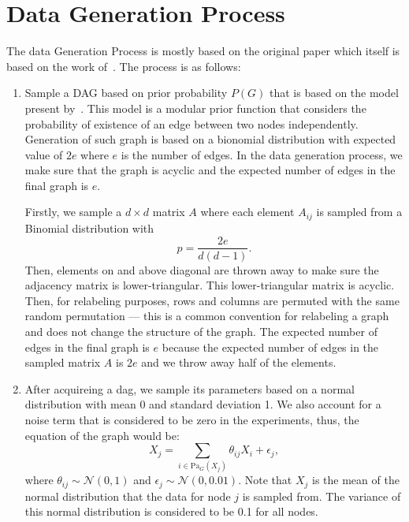 \documentclass{lxaiproposal}
\begin{document}
\begin{table}[h]
        \section{Data Generation Process}\label{app:data_generation}
        \vspace*{-3mm}

        The data Generation Process is mostly based on the original paper which itself is based on the work of~\cite{erdos1960evolutionrandomgraphs}.
        The process is as follows:

        \begin{enumerate}
            \item Sample a DAG based on prior probability $P(G)$ that is based on the model present by~\cite{erdos1960evolutionrandomgraphs}.
            This model is a modular prior function that considers the probability of existence of an edge between two
            nodes independently. Generation of such graph is based on a bionomial distribution with expected value of $2e$
            where $e$ is the number of edges. In the data generation process, we make sure that the graph is acyclic and
            the expected number of edges in the final graph is $e$.

            Firstly, we sample a $d \times d$ matrix $A$ where each element $A_{ij}$ is sampled from a Binomial
            distribution with
            \begin{equation}
                p = \frac{2e}{d(d-1)}.
                \label{eq:binomial}
            \end{equation}
            Then, elements on and above diagonal are thrown away to make sure the adjacency matrix is lower-triangular.
            This lower-triangular matrix is acyclic. Then, for relabeling purposes, rows and columns are permuted with
            the same random permutation --- this is a common convention for relabeling a graph and does not change the
            structure of the graph.
            The expected number of edges in the final graph is $e$ because the expected number of edges in the sampled
            matrix $A$ is $2e$ and we throw away half of the elements.

            \item After acquireing a dag, we sample its parameters
            based on a normal distribution with mean 0 and standard deviation 1. We also account for a noise term that
            is considered to be zero in the experiments, thus, the equation of the graph would be:
            \begin{equation}
                X_j = \sum_{i \in \text{Pa}_G(X_j)} \theta_{ij}X_i + \epsilon_j,
                \label{eq:graph}
            \end{equation}
            where $\theta_{ij} \sim \mathcal{N}(0, 1)$ and $\epsilon_j \sim \mathcal{N}(0, 0.01)$. Note that $X_j$ is the
            mean of the normal distribution that the data for node $j$ is sampled from. The variance of this normal
            distribution is considered to be 0.1 for all nodes.


\end{enumerate}
\end{table}
\end{document}
